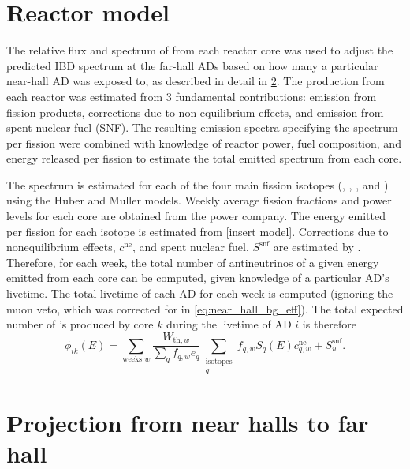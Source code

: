 \section{Reactor model}
\label{sec:reactor}

The relative flux and spectrum of \nuebar{} from each reactor core was used
to adjust the predicted IBD spectrum at the far-hall ADs
based on how many \nuebar{} a particular near-hall AD was exposed to,
as described in detail in \cref{sec:prediction}.
The \nuebar{} production from each reactor was estimated from 3 fundamental contributions:
emission from fission products, corrections due to non-equilibrium effects,
and emission from spent nuclear fuel (SNF).
The resulting emission spectra specifying the spectrum per fission
were combined with knowledge of reactor power, fuel composition,
and energy released per fission
to estimate the total emitted \nuebar{} spectrum from each core.

The \nuebar{} spectrum is estimated for each of the four main fission isotopes
(, , , and )
using the Huber and Muller models.
Weekly average fission fractions and power levels for each core
are obtained from the power company.
The energy emitted per fission for each isotope is estimated from
[insert model].
Corrections due to nonequilibrium effects, $c^{\text{ne}}$,
and spent nuclear fuel, $S^{\text{snf}}$
are estimated by .
Therefore, for each week, the total number of antineutrinos
of a given energy emitted from each core can be computed,
given knowledge of a particular AD's livetime.
The total livetime of each AD for each week is computed
(ignoring the muon veto, which was corrected for in
\cref{eq:near_hall_bg_eff}).
The total expected number of \nuebar{}'s produced by core $k$
during the livetime of AD $i$ is therefore
\begin{equation}\label{eq:reactor_spectrum}
    \phi_{ik}(E) = \sum_{\text{weeks }w}
        \frac{W_{\text{th},w}}{\sum_q f_{q,w} e_q}
        \sum_{\substack{\text{isotopes}\\q}}
        f_{q,w} S_q(E) c_{q,w}^{\text{ne}} + S_w^{\text{snf}}.
\end{equation}

\section{Projection from near halls to far hall}
\label{sec:prediction}

